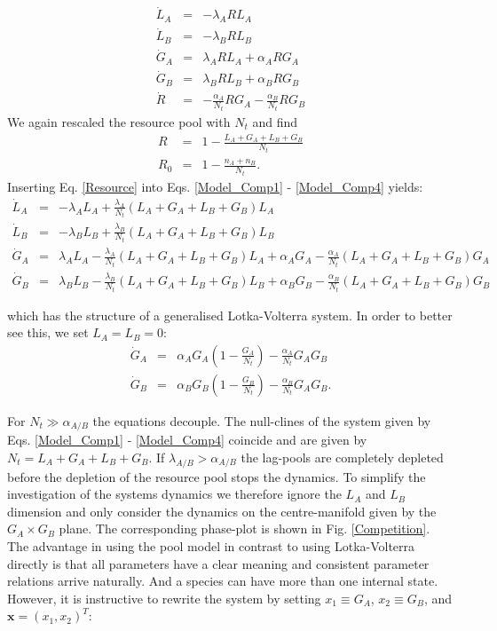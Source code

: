 \documentclass[10pt,A4paper]{article}
\begin{document}
\begin{eqnarray}
\label{Model_Comp1}
\dot{L}_A &=& - \lambda_A R L_A\\
\dot{L}_B &=& - \lambda_B R L_B \\
\dot{G}_A &=& \lambda_A R L_A +\alpha_A R G_A\\
\label{Model_Comp4}
\dot{G}_B &=& \lambda_B R L_B +\alpha_B R G_B\\
\dot{R} &=&-\frac{\alpha_A}{N_t} R G_A-\frac{\alpha_B}{N_t} R G_B
\end{eqnarray}
We again rescaled the resource pool with $N_t$ and find
\begin{eqnarray}
\label{Resource}
R &=&1-\frac{L_A+G_A+L_B+G_B}{N_t}\\
R_0&=&1-\frac{n_A+n_B}{N_t}. 
\end{eqnarray}
Inserting Eq. \ref{Resource} into Eqs. \ref{Model_Comp1} - \ref{Model_Comp4} yields:
\begin{eqnarray*}
\dot{L}_A &=& - \lambda_A  L_A + \frac{\lambda_A}{N_t}\left(L_A+G_A+L_B+G_B\right )L_A\\
\dot{L}_B &=& - \lambda_B L_B + \frac{\lambda_B}{N_t}\left(L_A+G_A+L_B+G_B\right )L_B \\
\dot{G}_A &=&  \lambda_A  L_A - \frac{\lambda_A}{N_t}\left(L_A+G_A+L_B+G_B\right )L_A +\alpha_A G_A - \frac{\alpha_A}{N_t}\left(L_A+G_A+L_B+G_B\right )G_A\\
\dot{G}_B &=& \lambda_B L_B - \frac{\lambda_B}{N_t}\left(L_A+G_A+L_B+G_B\right )L_B  +\alpha_B G_B -\frac{\alpha_B}{N_t}\left(L_A+G_A+L_B+G_B\right )G_B
\end{eqnarray*}

which has the structure of a generalised Lotka-Volterra system. 
In order to better see this, we set $L_A=L_B=0$: 
\begin{eqnarray}
\label{Comp_Model}
\dot{G}_A &=& \alpha_A G_A\left(1 - \frac{G_A}{N_t}\right ) - \frac{\alpha_A}{N_t}G_AG_B\\
\dot{G}_B &=& \alpha_B G_B\left(1-\frac{G_B}{N_t}\right ) -\frac{\alpha_B}{N_t}G_AG_B. 
\end{eqnarray} 

For $N_t\gg\alpha_{A/B}$ the equations decouple. 
The null-clines of the system given by Eqs. \ref{Model_Comp1} - \ref{Model_Comp4} coincide and are given by $N_t=L_A+G_A+L_B+G_B$. 
If $\lambda_{A/B}>\alpha_{A/B}$ the lag-pools are completely depleted before the depletion of the resource pool stops the dynamics. 
To simplify the investigation of the systems dynamics we therefore ignore the $L_A$ and $L_B$ dimension and only consider the dynamics on the centre-manifold given by the $G_A\times G_B$ plane. 
The corresponding phase-plot is shown in Fig. \ref{Competition}. 
The advantage in using the pool model in contrast to using Lotka-Volterra directly is that all parameters have a clear meaning and consistent parameter relations arrive naturally. 
And a species can have more than one internal state. 
However, it is instructive to rewrite the system by setting $x_1\equiv G_A$, $x_2\equiv G_B$, and $\mathbf{x}=(x_1,x_2)^T$:
\end{document}
